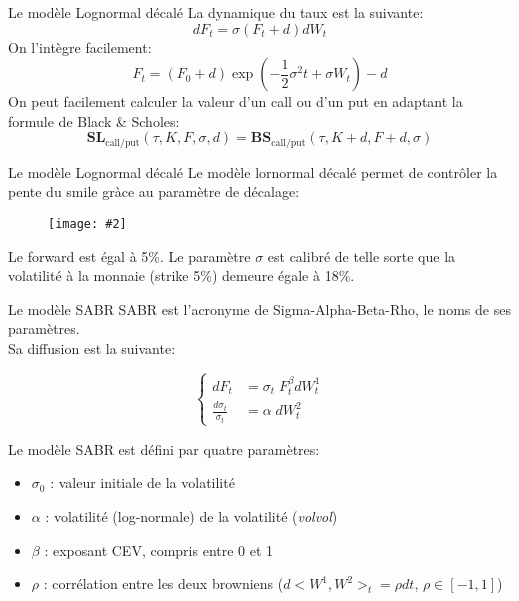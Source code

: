 \documentclass{beamer}
\newcommand{\FIG}[2]{\texttt{[image: \#2]}}
\begin{document}
\begin{frame}{Le modèle Lognormal décalé}
La dynamique du taux est la suivante:
\[
dF_t=\sigma (F_t + d)dW_t
\]
On l'intègre facilement:
\[
F_t = (F_0+d)\exp\left(-\frac{1}{2}\sigma^2t+\sigma W_{t} \right)-d
\]
On peut facilement calculer la valeur d'un call ou d'un put en adaptant la formule de Black \& Scholes:
\[
\mathbf{SL}_\text{call/put}(\tau,K,F,\sigma,d)=\mathbf{BS}_\text{call/put}(\tau,K+d,F+d,\sigma)
\]
\end{frame}

\begin{frame}{Le modèle Lognormal décalé}
Le modèle lornormal décalé permet de contrôler la pente du smile gràce au paramètre de décalage:\\
\begin{figure}[h]
\FIG{7cm}{figures/smile_shifted_log.jpg}
\end{figure}
Le forward est égal à 5\%. Le paramètre $\sigma$ est calibré de telle sorte que la volatilité à la monnaie (strike 5\%) demeure égale à 18\%. 
\end{frame}

\begin{frame}{Le modèle SABR}
SABR est l'acronyme de Sigma-Alpha-Beta-Rho, le noms de ses paramètres.\\
Sa diffusion est la suivante:

\[
\left\{
\begin{split}
dF_t &= \sigma_t \;F_t^\beta dW_t^1\\
\frac{d\sigma_t}{\sigma_t} &= \alpha \; dW_t^2
\end{split}
\right.
\]

Le modèle SABR est défini par quatre paramètres:

\begin{itemize}
\item $\sigma_0$ : valeur initiale de la volatilité

\item $\alpha$ : volatilité (log-normale) de la volatilité (\textit{volvol})

\item $\beta$ : exposant CEV, compris entre 0 et 1%

\item $\rho$ : corrélation entre les deux browniens ($d<W^1,W^2>_t = \rho dt$, $\rho\in[-1,1]$)

\end{itemize}
\end{frame}
\end{document}
